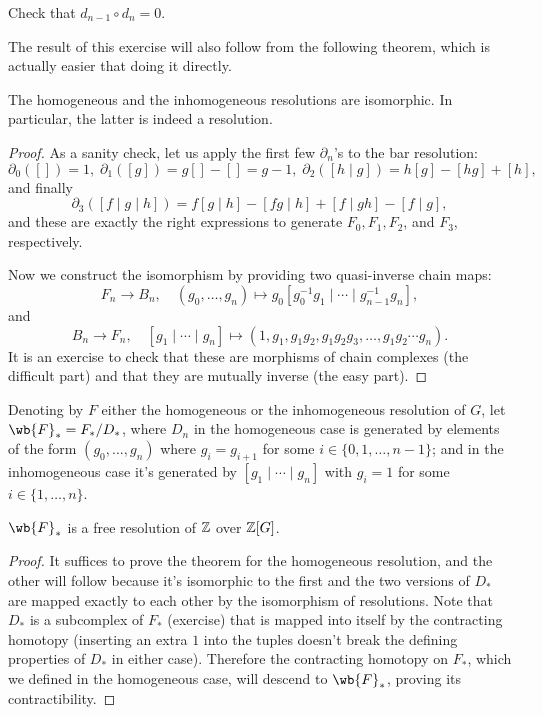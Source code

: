 \begin{xca}
    Check that $d_{n-1}\circ d_n=0$.
\end{xca}

The result of this exercise will also follow from the following theorem, which is actually easier that doing it directly.

\begin{thm}
    The homogeneous and the inhomogeneous resolutions are isomorphic. In particular, the latter is indeed a resolution.
\end{thm}
\begin{proof}
    As a sanity check, let us apply the first few $\partial_n$'s to the bar resolution:
    \[\partial_0([])=1,\; \partial_1([g])=g[]-[]=g-1,\; \partial_2([h\mid g])=h[g]-[hg]+[h],\] 
    and finally
    \[\partial_3([f\mid g\mid h])=f[g\mid h]-[fg\mid h]+[f\mid gh]-[f\mid g],\]
    and these are exactly the right expressions to generate $F_0,F_1,F_2$, and $F_3$, respectively.

    Now we construct the isomorphism by providing two quasi-inverse chain maps:
    \[F_n\to B_n,\quad (g_0,\ldots,g_n)\mapsto g_0[g_0^{-1}g_1\mid\cdots\mid g_{n-1}^{-1}g_n],\]
    and 
    \[B_n\to F_n,\quad [g_1\mid\cdots\mid g_n]\mapsto (1,g_1,g_1g_2,g_1g_2g_3,\ldots,g_1g_2\cdots g_n).\]
    It is an exercise to check that these are morphisms of chain complexes (the difficult part) and that they are mutually inverse (the easy part).
\end{proof}

\begin{defn}
    Denoting by $F$ either the homogeneous or the inhomogeneous resolution of $G$, let $\wb{F}_\ast=F_\ast\slash D_\ast$, where $D_n$ in the homogeneous case is generated by elements of the form $(g_0,\ldots,g_n)$ where $g_i=g_{i+1}$ for some $i\in\{0,1,\ldots,n-1\}$; and in the inhomogeneous case it's generated by $[g_1\mid\cdots\mid g_n]$ with $g_i=1$ for some $i\in\{1,\ldots,n\}$.
\end{defn}
\begin{thm}
    $\wb{F}_\ast$ is a free resolution of $\mathbb{Z}$ over $\mathbb{Z}[G]$.
\end{thm}
\begin{proof}
    It suffices to prove the theorem for the homogeneous resolution, and the other will follow because it's isomorphic to the first and the two versions of $D_\ast$ are mapped exactly to each other by the isomorphism of resolutions. Note that $D_\ast$ is a subcomplex of $F_\ast$ (exercise) that is mapped into itself by the contracting homotopy (inserting an extra $1$ into the tuples doesn't break the defining properties of $D_\ast$ in either case). Therefore the contracting homotopy on $F_\ast$, which we defined in the homogeneous case, will descend to $\wb{F}_\ast$, proving its contractibility.
\end{proof}





